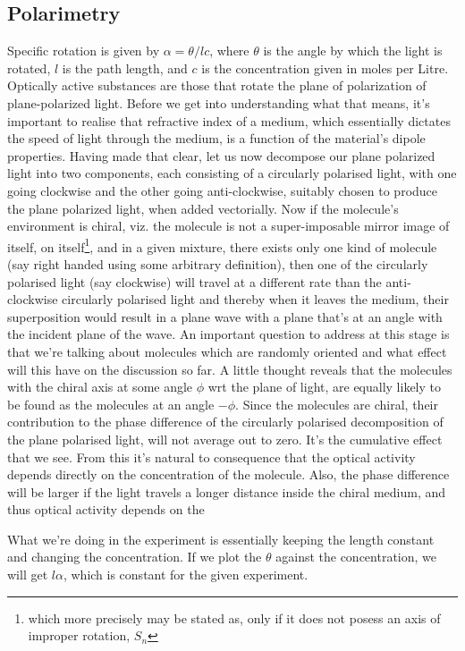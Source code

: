 	\subsection{Polarimetry}
		Specific rotation is given by $\alpha=\theta/lc$, where $\theta$ is the angle by which the light is rotated, $l$ is the path length, and $c$ is the concentration given in moles per Litre.
		Optically active substances are those that rotate the plane of polarization of plane-polarized light. Before we get into understanding what that means, it's important to realise that refractive index of a medium, which essentially dictates the speed of light through the medium, is a function of the material's dipole properties. Having made that clear, let us now decompose our plane polarized light into two components, each consisting of a circularly polarised light, with one going clockwise and the other going anti-clockwise, suitably chosen to produce the plane polarized light, when added vectorially. Now if the molecule's environment is chiral, viz. the molecule is not a super-imposable  mirror image of itself, on itself\footnote {which more precisely may be stated as, only if it does not posess an axis of improper rotation, $S_n$}, and in a given mixture, there exists only one kind of molecule (say right handed using some arbitrary definition), then one of the circularly polarised light (say clockwise) will travel at a different rate than the anti-clockwise circularly polarised light and thereby when it leaves the medium, their superposition would result in a plane wave with a plane that's at an angle with the incident plane of the wave. An important question to address at this stage is that we're talking about molecules which are randomly oriented and what effect will this have on the discussion so far. A little thought reveals that the molecules with the chiral axis at some angle $\phi$ wrt the plane of light, are equally likely to be found as the molecules at an angle $-\phi$. Since the molecules are chiral, their contribution to the phase difference of the circularly polarised decomposition of the plane polarised light, will not average out to zero. It's the cumulative effect that we see. From this it's natural to consequence that the optical activity depends directly on the concentration of the molecule. Also, the phase difference will be larger if the light travels a longer distance inside the chiral medium, and thus optical activity depends on the 
		\par
		What we're doing in the experiment is essentially keeping the length constant and changing the concentration. If we plot the $\theta$ against the concentration, we will get $l\alpha$, which is constant for the given experiment.


